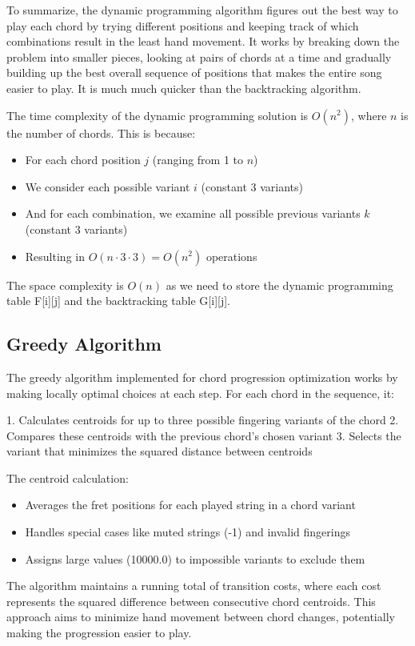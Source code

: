 \documentclass[lettersize,journal]{IEEEtran}
\begin{document}
To summarize, the dynamic programming algorithm figures out the best way to play each chord by trying different positions and keeping track of which combinations result in the least hand movement. It works by breaking down the problem into smaller pieces, looking at pairs of chords at a time and gradually building up the best overall sequence of positions that makes the entire song easier to play. It is much much quicker than the backtracking algorithm.

The time complexity of the dynamic programming solution is $O(n^2)$, where $n$ is the number of chords. This is because:
\begin{itemize}
    \item For each chord position $j$ (ranging from 1 to $n$)
    \item We consider each possible variant $i$ (constant 3 variants)
    \item And for each combination, we examine all possible previous variants $k$ (constant 3 variants)
    \item Resulting in $O(n \cdot 3 \cdot 3) = O(n^2)$ operations
\end{itemize}

The space complexity is $O(n)$ as we need to store the dynamic programming table F[i][j] and the backtracking table G[i][j].

\subsection{Greedy Algorithm}
The greedy algorithm implemented for chord progression optimization works by making locally optimal choices at each step. For each chord in the sequence, it:

1. Calculates centroids for up to three possible fingering variants of the chord
2. Compares these centroids with the previous chord's chosen variant
3. Selects the variant that minimizes the squared distance between centroids

The centroid calculation:
\begin{itemize}
    \item Averages the fret positions for each played string in a chord variant
    \item Handles special cases like muted strings (-1) and invalid fingerings
    \item Assigns large values (10000.0) to impossible variants to exclude them
\end{itemize}

The algorithm maintains a running total of transition costs, where each cost represents the squared difference between consecutive chord centroids. This approach aims to minimize hand movement between chord changes, potentially making the progression easier to play.
\end{document}
